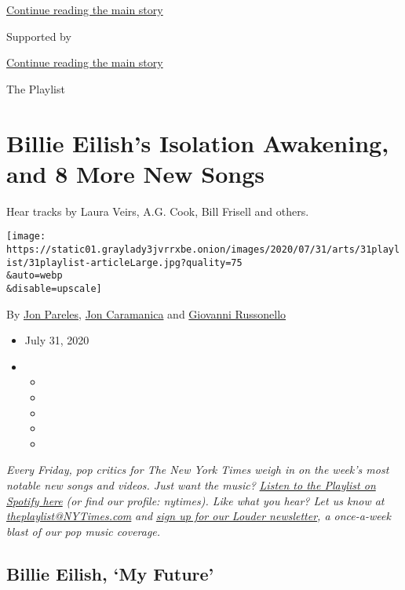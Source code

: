 \protect\hyperlink{after-top}{Continue reading the main story}

Supported by

\protect\hyperlink{after-sponsor}{Continue reading the main story}

The Playlist

\hypertarget{billie-eilishs-isolation-awakening-and-8-more-new-songs}{%
\section{Billie Eilish's Isolation Awakening, and 8 More New
Songs}\label{billie-eilishs-isolation-awakening-and-8-more-new-songs}}

Hear tracks by Laura Veirs, A.G. Cook, Bill Frisell and others.

\texttt{[image: https://static01.graylady3jvrrxbe.onion/images/2020/07/31/arts/31playlist/31playlist-articleLarge.jpg?quality=75\\\&auto=webp\\\&disable=upscale]}

By \href{https://www.nytimes3xbfgragh.onion/by/jon-pareles}{Jon
Pareles},
\href{https://www.nytimes3xbfgragh.onion/by/jon-caramanica}{Jon
Caramanica} and
\href{https://www.nytimes3xbfgragh.onion/by/giovanni-russonello}{Giovanni
Russonello}

\begin{itemize}
\item
  July 31, 2020
\item
  \begin{itemize}
  \item
  \item
  \item
  \item
  \item
  \end{itemize}
\end{itemize}

\emph{Every Friday, pop critics for The New York Times weigh in on the
week's most notable new songs and videos. Just want the music?}
\href{https://open.spotify.com/playlist/5S3JLpPLj9BsLFyaVHf8Nf?si=h85ZkCLVT7e_XvKKNuBdPQ}{\emph{Listen
to the Playlist on Spotify here}} \emph{(or find our profile: nytimes).
Like what you hear? Let us know at}
\href{mailto:theplaylist@NYTimes.com}{\emph{theplaylist@NYTimes.com}}
\emph{and}
\href{https://www.nytimes3xbfgragh.onion/newsletters/louder?module=inline}{\emph{sign
up for our Louder newsletter}}\emph{, a once-a-week blast of our pop
music coverage.}

\hypertarget{billie-eilish-my-future}{%
\subsection{Billie Eilish, `My Future'}\label{billie-eilish-my-future}}

